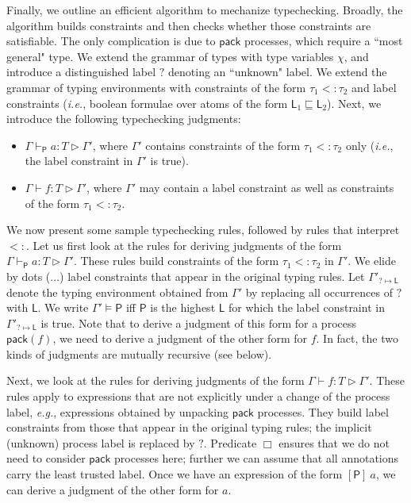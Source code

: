\documentclass{sigplanconf}
\newcommand{\lab}{\mathsf L}
\newcommand{\labp}{\mathsf P}
\begin{document}
\noindent
Finally, we outline an efficient algorithm to mechanize typechecking. Broadly, the algorithm builds constraints and then checks whether those constraints are satisfiable. The only complication is due to $\mathsf{pack}$ processes, which require a ``most general" type. We extend the grammar of types with type variables $\chi$, and introduce a distinguished label $?$ denoting an ``unknown" label. We extend the grammar of typing environments with constraints of the form $\tau_1 <: \tau_2$ and label constraints (\emph{i.e.}, boolean formulae over atoms of the form $\lab_1 \sqsubseteq \lab_2$).  Next, we introduce the following typechecking judgments: 
\begin{itemize}
\item $\Gamma \vdash_{\labp} a : T \rhd \Gamma'$, where $\Gamma'$ contains constraints of the form $\tau_1 <: \tau_2$ only (\emph{i.e.}, the label constraint in $\Gamma'$ is true). 
\item $\Gamma \vdash f : T \rhd \Gamma'$, where $\Gamma'$ may contain a label constraint as well as constraints of the form $\tau_1 <: \tau_2$. 
\end{itemize}
We now present some sample typechecking rules, followed by rules that interpret $<:$. Let us first look at the rules for deriving judgments of the form $\Gamma \vdash_{\labp} a : T \rhd \Gamma'$. These rules build constraints of the form $\tau_1 <: \tau_2$ in $\Gamma'$. We elide by dots ($\dots$) label constraints that appear in the original typing rules. Let $\Gamma'_{? \mapsto \lab}$ denote the typing environment obtained from $\Gamma'$ by replacing all occurrences of $?$ with $\lab$. We write $\Gamma' \models \labp$ iff $\labp$ is the highest $\lab$ for which the label constraint in $\Gamma'_{?\mapsto \lab}$ is true. Note that to derive a judgment of this form for a process $\mathsf{pack}(f)$, we need to derive a judgment of the other form for $f$. In fact, the two kinds of judgments are mutually recursive (see below).


Next, we look at the rules for deriving judgments of the form $\Gamma \vdash f : T \rhd \Gamma'$. These rules apply to expressions that are not explicitly under a change of the process label, \emph{e.g.}, expressions obtained by unpacking $\mathsf{pack}$ processes. They build label constraints from those that appear in the original typing rules; the implicit (unknown) process label is replaced by $?$. Predicate $\Box$ ensures that we do not need to consider $\mathsf{pack}$ processes here; further we can assume that all annotations carry the least trusted label. Once we have an expression of the form $[\labp]~a$, we can derive a judgment of the other form for $a$.
\end{document}
